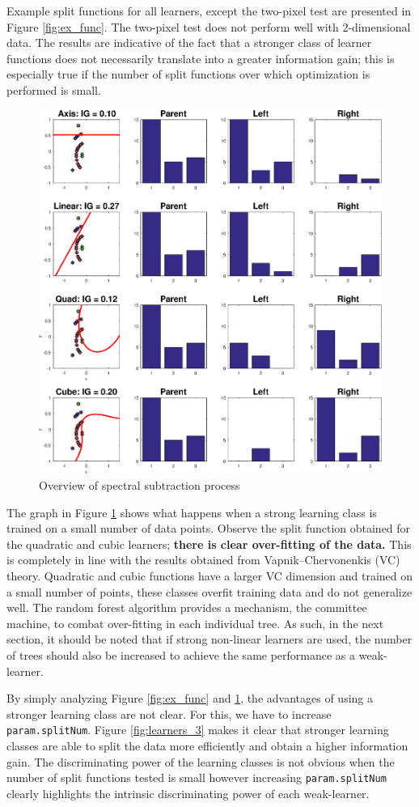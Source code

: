 \documentclass[a4paper,pra,twocolumn,10pt,aps,longbibliography,nobalancelastpage]{revtex4-1}
\begin{document}
Example split functions for all learners, except the two-pixel test are presented in Figure \ref{fig:ex_func}. The two-pixel test does not perform well with 2-dimensional data. The results are indicative of the fact that a stronger class of learner functions does not necessarily translate into a greater information gain; this is especially true if the number of split functions over which optimization is performed is small.

\begin{figure}[H]
	\centering
    \includegraphics[width=0.60\columnwidth]{split_function_visualitions_3}
    \caption{Overview of spectral subtraction process}
    \label{fig:learners_2}
\end{figure}

The graph in Figure \ref{fig:learners_2} shows what happens when a strong learning class is trained on a small number of data points. Observe the split function obtained for the quadratic and cubic learners; \textbf{there is clear over-fitting of the data.} This is completely in line with the results obtained from Vapnik--Chervonenkis (VC) theory. Quadratic and cubic functions have a larger VC dimension and trained on a small number of points, these classes overfit training data and do not generalize well. The random forest algorithm provides a mechanism, the committee machine, to combat over-fitting in each individual tree. As such, in the next section, it should be noted that if strong non-linear learners are used, the number of trees should also be increased to achieve the same performance as a weak-learner. 

By simply analyzing Figure \ref{fig:ex_func} and \ref{fig:learners_2}, the advantages of using a stronger learning class are not clear. For this, we have to increase \texttt{param.splitNum}. Figure \ref{fig:learners_3} makes it clear that stronger learning classes are able to split the data more efficiently and obtain a higher information gain. The discriminating power of the learning classes is not obvious when the number of split functions tested is small however increasing \texttt{param.splitNum} clearly highlights the intrinsic discriminating power of each weak-learner. 
\end{document}
